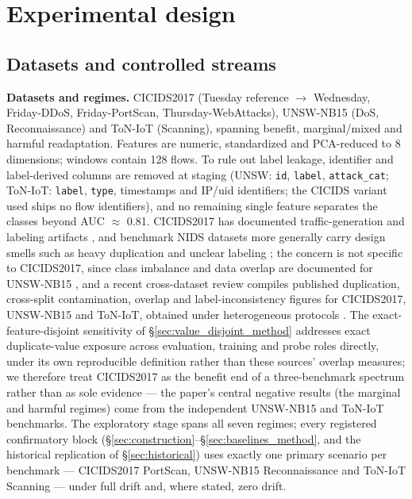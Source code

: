 \documentclass[a4paper,fleqn]{cas-sc}
\begin{document}
\section{Experimental design}


\subsection{Datasets and controlled streams}


\textbf{Datasets and regimes.} CICIDS2017 \cite{sharafaldin2018toward} (Tuesday reference $\to$ Wednesday, Friday-DDoS, Friday-PortScan, Thursday-WebAttacks), UNSW-NB15 \cite{moustafa2015unsw} (DoS, Reconnaissance) and ToN-IoT \cite{alsaedi2020toniot} (Scanning), spanning benefit, marginal/mixed and harmful readaptation. Features are numeric, standardized and PCA-reduced to 8 dimensions; windows contain 128 flows. To rule out label leakage, identifier and label-derived columns are removed at staging (UNSW: \texttt{id}, \texttt{label}, \texttt{attack\_cat}; ToN-IoT: \texttt{label}, \texttt{type}, timestamps and IP/uid identifiers; the CICIDS variant used ships no flow identifiers), and no remaining single feature separates the classes beyond AUC $\approx$ 0.81. CICIDS2017 has documented traffic-generation and labeling artifacts \cite{engelen2021troubleshooting,lanvin2022errors}, and benchmark NIDS datasets more generally carry design smells such as heavy duplication and unclear labeling \cite{flood2024smells}; the concern is not specific to CICIDS2017, since class imbalance and data overlap are documented for UNSW-NB15 \cite{zoghi2024unsw}, and a recent cross-dataset review compiles published duplication, cross-split contamination, overlap and label-inconsistency figures for CICIDS2017, UNSW-NB15 and ToN-IoT, obtained under heterogeneous protocols \cite{aburomman2026automl}. The exact-feature-disjoint sensitivity of \S\ref{sec:value_disjoint_method} addresses exact duplicate-value exposure across evaluation, training and probe roles directly, under its own reproducible definition rather than these sources' overlap measures; we therefore treat CICIDS2017 as the benefit end of a three-benchmark spectrum rather than as sole evidence --- the paper's central negative results (the marginal and harmful regimes) come from the independent UNSW-NB15 and ToN-IoT benchmarks. The exploratory stage spans all seven regimes; every registered confirmatory block (\S\ref{sec:construction}--\S\ref{sec:baselines_method}, and the historical replication of \S\ref{sec:historical}) uses exactly one primary scenario per benchmark --- CICIDS2017 PortScan, UNSW-NB15 Reconnaissance and ToN-IoT Scanning --- under full drift and, where stated, zero drift.
\end{document}
